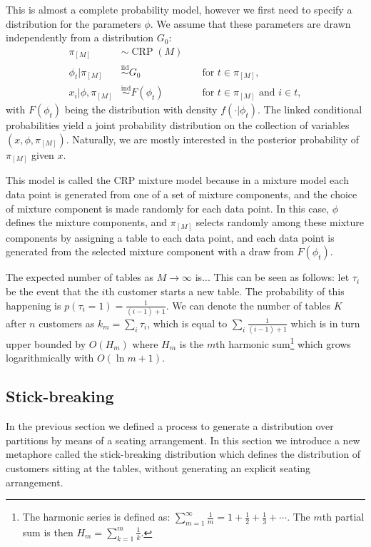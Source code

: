 This is almost a complete probability model, however we first need to specify a distribution for the parameters $\phi$. We assume that these parameters are drawn independently from a distribution $G_0$:
\begin{align}
	\pi_{[M]} &\sim \operatorname{CRP}(M)\label{eq:CRPMMpartition} \\
    \phi_t | \pi_{[M]} &\overset{\text{iid}}{\sim} G_0 && \text{ for }t\in\pi_{[M]},\label{eq:CRPMMlatent} \\
    x_i|\phi,\pi_{[M]} &\overset{\text{ind}}{\sim} F(\phi_t) && \text{ for }t\in\pi_{[M]}\text{ and }i\in t,\label{eq:CRPMMdatapoints}
\end{align}
with $F(\phi_t)$ being the distribution with density $f(\cdot|\phi_t)$. The linked conditional probabilities yield a joint probability distribution on the collection of variables $(x,\phi,\pi_{[M]})$. Naturally, we are mostly interested in the posterior probability of $\pi_{[M]}$ given $x$.

This model is called the CRP mixture model because in a mixture model each data point is generated from one of a set of mixture components, and the choice of mixture component is made randomly for each data point. In this case, $\phi$ defines the mixture components, and $\pi_{[M]}$ selects randomly among these mixture components by assigning a table to each data point, and each data point is generated from the selected mixture component with a draw from $F(\phi_t)$.

The expected number of tables as $M \rightarrow \infty$ is... This can be seen as follows: let $\tau_i$ be the event that the $i$th customer starts a new table. The probability of this happening is $p(\tau_i = 1) = \frac{1}{(i-1)+1}$. We can denote the number of tables $K$ after $n$ customers as $k_m = \sum_i \tau_i$, which is equal to $\sum_i \frac{1}{(i-1)+1}$ which is in turn upper bounded by $O(H_m)$ where $H_m$ is the $m$th harmonic sum\footnote{The harmonic series is defined as: $\sum_{m=1}^\infty \frac{1}{m} = 1 + \frac{1}{2} + \frac{1}{3} + \cdots$. The $m$th partial sum is then $H_m=\sum_{k=1}^m \frac{1}{k}$.} which grows logarithmically with $O(\ln m+1)$. 



\subsection{Stick-breaking}
In the previous section we defined a process to generate a distribution over partitions by means of a seating arrangement. In this section we introduce a new metaphore called the stick-breaking distribution which defines the distribution of customers sitting at the tables, without generating an explicit seating arrangement.

